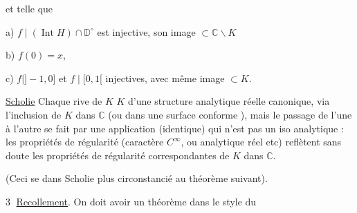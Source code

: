 
et telle que

a) $f\mid(\operatorname{Int}H)\cap\mathbb D^\circ$ est injective, son image $\subset\mathbb C\smallsetminus K$

b) $f(0)=x$, 

c) $f\mid ]-1,0]$ et $f\mid[0,1[$ injectives, avec même image $\subset K$.

\uline{Scholie} Chaque rive de $K$   $K$ d'une structure analytique réelle canonique, via l'inclusion de $K$ dans $\mathbb C$ (ou dans une surface conforme ), mais le passage de l'une à l'autre se fait par une application (identique) qui n'est pas un iso analytique : les propriétés de régularité (caractère $C^\infty$, ou analytique réel etc) reflètent sans doute les propriétés de régularité correspondantes de $K$ dans $\mathbb C$.

(Ceci  se  dans   Scholie plus circonstancié au théorème suivant).

\textcircled{3} \uline{Recollement}. On doit avoir un théorème dans le style du
